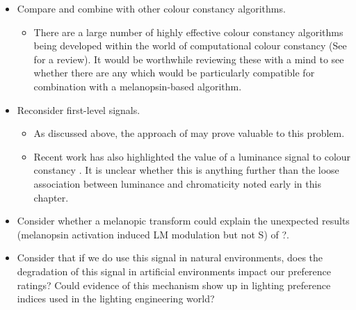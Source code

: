 \begin{itemize}
\begin{itemize}
\end{itemize}
\item Compare and combine with other colour constancy algorithms.
\begin{itemize}
    \item There are a large number of highly effective colour constancy algorithms being developed within the world of computational colour constancy (See \citet{gijsenij_computational_2011} for a review). It would be worthwhile reviewing these with a mind to see whether there are any which would be particularly compatible for combination with a melanopsin-based algorithm.
\end{itemize}
\item Reconsider first-level signals.
\begin{itemize}
    \item As discussed above, the approach of \citet{maloney_color_1986} may prove valuable to this problem.
    \item Recent work has also highlighted the value of a luminance signal to colour constancy \citep{chakrabarti_color_2015}. It is unclear whether this is anything further than the loose association between luminance and chromaticity noted early in this chapter.
\end{itemize}
\item Consider whether a melanopic transform could explain the unexpected results (melanopsin activation induced LM modulation but not S) of \citet{cao_evidence_2018}?.
\item Consider that if we do use this signal in natural environments, does the degradation of this signal in artificial environments impact our preference ratings? Could evidence of this mechanism show up in lighting preference indices used in the lighting engineering world?
\end{itemize}







